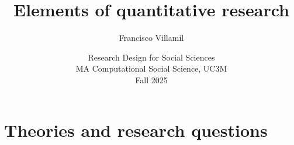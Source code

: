\documentclass[aspectratio=43]{beamer}
\title[Lecture 2: Elements of quantitative research]{\Large Elements of quantitative research}
\author[]{Francisco Villamil}
\date[]{Research Design for Social Sciences\\MA Computational Social Science, UC3M\\Fall 2025}
\begin{document}

\begin{frame}
  \titlepage
\end{frame}

\section{Theories and research questions}





\end{document}
